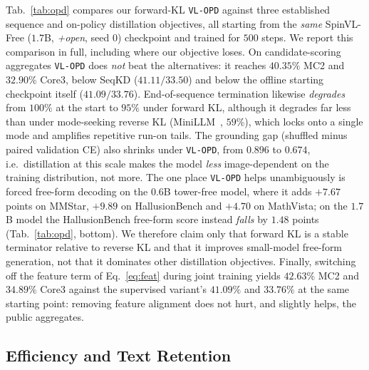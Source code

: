 \documentclass[10pt,twocolumn,letterpaper]{article}
\newcommand{\modelname}{SpinVL}
\begin{document}
Tab.~\ref{tab:opd} compares our forward-KL \texttt{VL-OPD} against three
established sequence and on-policy distillation objectives, all starting from
the \emph{same} \modelname-Free ($1.7$B, \emph{+open}, seed $0$) checkpoint and
trained for $500$ steps. We report this comparison in full, including where our
objective loses. On candidate-scoring aggregates \texttt{VL-OPD} does
\emph{not} beat the alternatives: it reaches $40.35\%$ MC2 and $32.90\%$ Core3,
below SeqKD ($41.11/33.50$) and below the offline starting checkpoint itself
($41.09/33.76$). End-of-sequence termination likewise \emph{degrades} from
$100\%$ at the start to $95\%$ under forward KL, although it degrades far less
than under mode-seeking reverse KL (MiniLLM~\citep{gu2024minillm}, $59\%$),
which locks onto a single mode and amplifies repetitive run-on tails. The
grounding gap (shuffled minus paired validation CE) also shrinks under
\texttt{VL-OPD}, from $0.896$ to $0.674$, i.e.\ distillation at this scale makes
the model \emph{less} image-dependent on the training distribution, not more.
The one place \texttt{VL-OPD} helps unambiguously is forced free-form decoding
on the $0.6$B tower-free model, where it adds $+7.67$ points on MMStar, $+9.89$
on HallusionBench and $+4.70$ on MathVista; on the $1.7$B model the HallusionBench
free-form score instead \emph{falls} by $1.48$ points
(Tab.~\ref{tab:opd}, bottom). We therefore claim only that forward KL is a
stable terminator relative to reverse KL and that it improves small-model
free-form generation, not that it dominates other distillation objectives.
Finally, switching off the feature term of Eq.~\eqref{eq:feat} during joint
training yields $42.63\%$ MC2 and $34.89\%$ Core3 against the supervised
variant's $41.09\%$ and $33.76\%$ at the same starting point: removing feature
alignment does not hurt, and slightly helps, the public aggregates.

\subsection{Efficiency and Text Retention}
\label{sec:eff}
\end{document}
